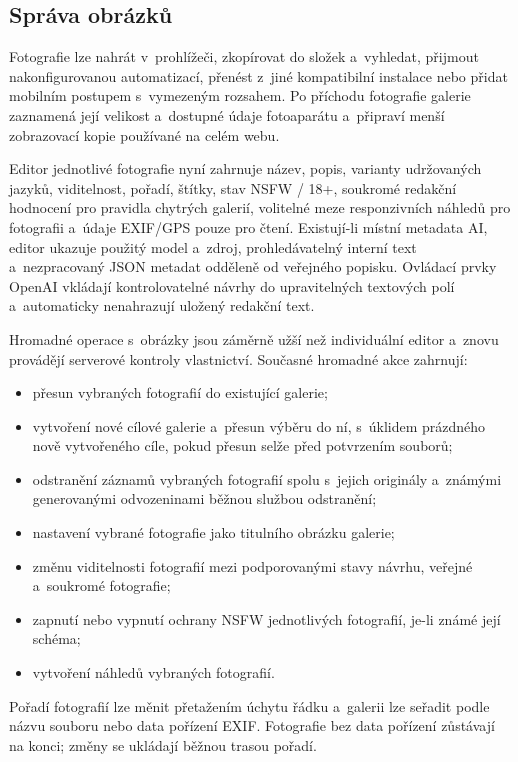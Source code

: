\documentclass[11pt,a4paper]{article}
\begin{document}
\subsection{Správa obrázků}
\label{sec:media}

Fotografie lze nahrát v~prohlížeči, zkopírovat do složek a~vyhledat, přijmout
nakonfigurovanou automatizací, přenést z~jiné kompatibilní instalace nebo přidat
mobilním postupem s~vymezeným rozsahem. Po příchodu fotografie galerie zaznamená
její velikost a~dostupné údaje fotoaparátu a~připraví menší zobrazovací kopie
používané na celém webu.

Editor jednotlivé fotografie nyní zahrnuje název, popis, varianty udržovaných
jazyků, viditelnost, pořadí, štítky, stav NSFW / 18+, soukromé redakční
hodnocení pro pravidla chytrých galerií, volitelné meze responzivních náhledů
pro fotografii a~údaje EXIF/GPS pouze pro čtení. Existují-li místní metadata AI,
editor ukazuje použitý model a~zdroj, prohledávatelný interní text
a~nezpracovaný JSON metadat odděleně od veřejného popisku. Ovládací prvky OpenAI
vkládají kontrolovatelné návrhy do upravitelných textových polí a~automaticky
nenahrazují uložený redakční text.

Hromadné operace s~obrázky jsou záměrně užší než individuální editor a~znovu
provádějí serverové kontroly vlastnictví. Současné hromadné akce zahrnují:

\begin{itemize}
  \item přesun vybraných fotografií do existující galerie;
  \item vytvoření nové cílové galerie a~přesun výběru do ní, s~úklidem prázdného
  nově vytvořeného cíle, pokud přesun selže před potvrzením souborů;
  \item odstranění záznamů vybraných fotografií spolu s~jejich originály
  a~známými generovanými odvozeninami běžnou službou odstranění;
  \item nastavení vybrané fotografie jako titulního obrázku galerie;
  \item změnu viditelnosti fotografií mezi podporovanými stavy návrhu, veřejné
  a~soukromé fotografie;
  \item zapnutí nebo vypnutí ochrany NSFW jednotlivých fotografií, je-li známé
  její schéma;
  \item vytvoření náhledů vybraných fotografií.
\end{itemize}

Pořadí fotografií lze měnit přetažením úchytu řádku a~galerii lze seřadit podle
názvu souboru nebo data pořízení EXIF. Fotografie bez data pořízení zůstávají na
konci; změny se ukládají běžnou trasou pořadí.
\end{document}
